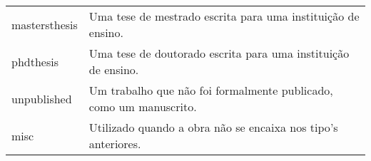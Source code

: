 \begin{tabular}{lp{}}
    \textsf{mastersthesis} & Uma tese de mestrado escrita para uma instituição de ensino. \\
    \textsf{phdthesis} & Uma tese de doutorado escrita para uma instituição de ensino. \\
    \textsf{unpublished} & Um trabalho que não foi formalmente publicado, como um manuscrito. \\
    \textsf{misc} & Utilizado quando a obra não se encaixa nos \textsf{tipo}'s anteriores.
\end{tabular}

